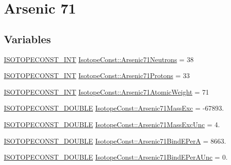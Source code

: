 \hypertarget{group___isotope_const-_arsenic-_as71}{}\section{Arsenic 71}
\label{group___isotope_const-_arsenic-_as71}
\subsection*{Variables}
\begin{DoxyCompactItemize}
\item 
\mbox{\hyperlink{group___isotope_const-_macros_ga5f18360b3e99483a35c32d789e62621c}{I\+S\+O\+T\+O\+P\+E\+C\+O\+N\+S\+T\+\_\+\+I\+NT}} \mbox{\hyperlink{group___isotope_const-_arsenic-_as71_gad7758f988b132cb80d0824753cfe0b02}{Isotope\+Const\+::\+Arsenic71\+Neutrons}} = 38
\item 
\mbox{\hyperlink{group___isotope_const-_macros_ga5f18360b3e99483a35c32d789e62621c}{I\+S\+O\+T\+O\+P\+E\+C\+O\+N\+S\+T\+\_\+\+I\+NT}} \mbox{\hyperlink{group___isotope_const-_arsenic-_as71_ga9ac7826ac43a562ae7e4433c4ea323f3}{Isotope\+Const\+::\+Arsenic71\+Protons}} = 33
\item 
\mbox{\hyperlink{group___isotope_const-_macros_ga5f18360b3e99483a35c32d789e62621c}{I\+S\+O\+T\+O\+P\+E\+C\+O\+N\+S\+T\+\_\+\+I\+NT}} \mbox{\hyperlink{group___isotope_const-_arsenic-_as71_ga4c10485f4e4b6f8e997e41df92700a24}{Isotope\+Const\+::\+Arsenic71\+Atomic\+Weight}} = 71
\item 
\mbox{\hyperlink{group___isotope_const-_macros_ga8f45a7272ce02c0b4c65c44636ed719a}{I\+S\+O\+T\+O\+P\+E\+C\+O\+N\+S\+T\+\_\+\+D\+O\+U\+B\+LE}} \mbox{\hyperlink{group___isotope_const-_arsenic-_as71_gac778bc53519616e5996cb556ed36c9f3}{Isotope\+Const\+::\+Arsenic71\+Mass\+Exc}} = -\/67893.
\item 
\mbox{\hyperlink{group___isotope_const-_macros_ga8f45a7272ce02c0b4c65c44636ed719a}{I\+S\+O\+T\+O\+P\+E\+C\+O\+N\+S\+T\+\_\+\+D\+O\+U\+B\+LE}} \mbox{\hyperlink{group___isotope_const-_arsenic-_as71_ga67fb0706ca70c734a051638e24e739a4}{Isotope\+Const\+::\+Arsenic71\+Mass\+Exc\+Unc}} = 4.
\item 
\mbox{\hyperlink{group___isotope_const-_macros_ga8f45a7272ce02c0b4c65c44636ed719a}{I\+S\+O\+T\+O\+P\+E\+C\+O\+N\+S\+T\+\_\+\+D\+O\+U\+B\+LE}} \mbox{\hyperlink{group___isotope_const-_arsenic-_as71_gabe784c6d5e72d5f8c7221651ccc0d3f0}{Isotope\+Const\+::\+Arsenic71\+Bind\+E\+PerA}} = 8663.
\item 
\mbox{\hyperlink{group___isotope_const-_macros_ga8f45a7272ce02c0b4c65c44636ed719a}{I\+S\+O\+T\+O\+P\+E\+C\+O\+N\+S\+T\+\_\+\+D\+O\+U\+B\+LE}} \mbox{\hyperlink{group___isotope_const-_arsenic-_as71_gae52d576924898671276a21722e46fc17}{Isotope\+Const\+::\+Arsenic71\+Bind\+E\+Per\+A\+Unc}} = 0.

\end{DoxyCompactItemize}
